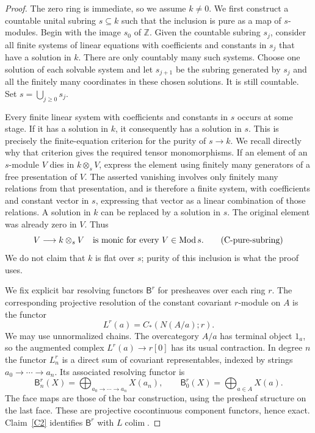\begin{proof}
The zero ring is immediate, so we assume $k\ne0$. We first construct a countable unital subring $s\subseteq k$ such that the inclusion is pure as a map of $s$-modules. Begin with the image $s_0$ of $\mathbb Z$. Given the countable subring $s_j$, consider all finite systems of linear equations with coefficients and constants in $s_j$ that have a solution in $k$. There are only countably many such systems. Choose one solution of each solvable system and let $s_{j+1}$ be the subring generated by $s_j$ and all the finitely many coordinates in these chosen solutions. It is still countable. Set $s=\bigcup_{j\geq0}s_j$.

Every finite linear system with coefficients and constants in $s$ occurs at some stage. If it has a solution in $k$, it consequently has a solution in $s$. This is precisely the finite-equation criterion for the purity of $s\to k$. We recall directly why that criterion gives the required tensor monomorphisms. If an element of an $s$-module $V$ dies in $k\otimes_sV$, express the element using finitely many generators of a free presentation of $V$. The asserted vanishing involves only finitely many relations from that presentation, and is therefore a finite system, with coefficients and constant vector in $s$, expressing that vector as a linear combination of those relations. A solution in $k$ can be replaced by a solution in $s$. The original element was already zero in $V$. Thus
\[
 V\longrightarrow k\otimes_sV
 \quad\text{is monic for every }V\in\operatorname{Mod} s.
 \tag{C-pure-subring}\label{Cpuresubring}
\]
We do not claim that $k$ is flat over $s$; purity of this inclusion is what the proof uses.

We fix explicit bar resolving functors $\mathsf B^r$ for presheaves over each ring $r$. The corresponding projective resolution of the constant covariant $r$-module on $A$ is the functor
\[
 L^r(a)=C_*(N(A/a);r).
\]
We may use unnormalized chains. The overcategory $A/a$ has terminal object $1_a$, so the augmented complex $L^r(a)\to r[0]$ has its usual contraction. In degree $n$ the functor $L^r_n$ is a direct sum of covariant representables, indexed by strings $a_0\to\cdots\to a_n$. Its associated resolving functor is
\[
 \mathsf B^r_n(X)=
 \bigoplus_{a_0\to\cdots\to a_n}X(a_n),
 \qquad
 \mathsf B^r_0(X)=\bigoplus_{a\in A}X(a).
 \tag{C-bar-formula}\label{Cbarformula}
\]
The face maps are those of the bar construction, using the presheaf structure on the last face. These are projective cocontinuous component functors, hence exact. Claim~\ref{C2} identifies $\mathsf B^r$ with $L\operatorname{colim}$.


\end{proof}

